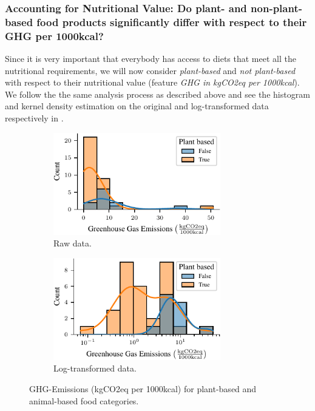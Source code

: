 \documentclass{article}
\begin{document}
\subsubsection*{Accounting  for Nutritional Value: Do plant- and non-plant-based food products significantly differ with respect to their GHG per 1000kcal?}

Since it is very important that everybody has access to diets that meet all the nutritional requirements, we will now consider \textit{plant-based} and \textit{not plant-based} with respect to their nutritional value (feature \textit{GHG in kgCO2eq per 1000kcal}). We follow the the same analysis process as described above and see the histogram and kernel density estimation on the original and log-transformed data respectively in .

\begin{figure}[h]
  \centering
  \begin{subfigure}[b]{0.49\textwidth}
    \centering
    \includegraphics[width=0.8\textwidth]{figures/ghg.pdf}
    \caption{Raw data.}
    \label{fig:ghg}
  \end{subfigure}%
  \hfill
  \begin{subfigure}[b]{0.49\textwidth}
    \centering
    \includegraphics[width=0.8\textwidth]{figures/ghg-log.pdf}
    \caption{Log-transformed data.}
    \label{fig:ghg-log}
  \end{subfigure}
  \caption{GHG-Emissions (kgCO2eq per 1000kcal) for plant-based and animal-based food categories.}
  \label{fig:ghg-combined}
\end{figure}
\end{document}
